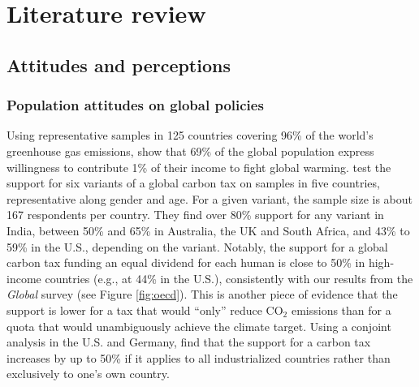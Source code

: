 \clearpage
\section{Literature review}\label{sec:literature}

\subsection{Attitudes and perceptions}\label{subsec:literature_attitudes}

\subsubsection{Population attitudes on global policies}\label{subsubsec:literature_attitudes_policies}
Using representative samples in 125 countries covering 96\% of the world's greenhouse gas emissions,  show that 69\% of the global population express willingness to contribute 1\% of their income to fight global warming. 
 test the support for six variants of a global carbon tax on samples in five countries, representative along gender and age. For a given variant, the sample size is about 167 respondents per country. They find over 80\% support for any variant in India, between 50\% and 65\% in Australia, the UK and South Africa, and 43\% to 59\% in the U.S., depending on the variant. Notably, the support for a global carbon tax funding an equal dividend for each human is close to 50\% in high-income countries (e.g., at 44\% in the U.S.), consistently with our results from the \textit{Global} survey (see Figure \ref{fig:oecd}). This is another piece of evidence that the support is lower for a tax that would ``only'' reduce CO$_\text{2}$ emissions than for a quota that would unambiguously achieve the climate target. %
Using a conjoint analysis in the U.S. and Germany,  find that the support for a carbon tax increases by up to 50\% %
if it applies to all industrialized countries rather than exclusively to one's own country. %

